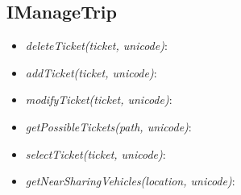 \subsection{IManageTrip}
\label{subsect:IManageTrip}

\begin{itemize}
	\item\textit{deleteTicket(ticket, unicode)}:
	\item\textit{addTicket(ticket, unicode)}:
	\item\textit{modifyTicket(ticket, unicode)}:
	\item\textit{getPossibleTickets(path, unicode)}:
	\item\textit{selectTicket(ticket, unicode)}:
	\item\textit{getNearSharingVehicles(location, unicode)}:
\end{itemize}